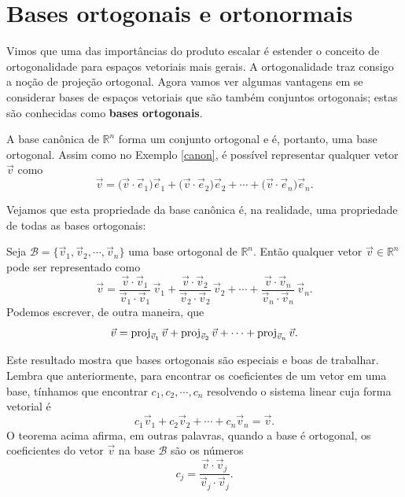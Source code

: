 \construirExer

\section{Bases ortogonais e ortonormais}


Vimos que uma das importâncias do produto escalar é estender o conceito de ortogonalidade para espaços vetoriais mais gerais. A ortogonalidade traz consigo a noção de projeção ortogonal. Agora vamos ver algumas vantagens em se considerar bases de espaços vetoriais que são também conjuntos ortogonais; estas são conhecidas como \textbf{bases ortogonais}.

\begin{ex}\label{ortonormal}
	A base canônica de $\mathbb{R}^n$ forma um conjunto ortogonal e é, portanto, uma base ortogonal. Assim como no Exemplo \ref{canon}, é possível representar qualquer vetor $\vec{v}$ como
	\begin{equation}
	\vec{v} = \big( \vec{v} \cdot \vec{e}_1 \big) \vec{e}_1 + \big( \vec{v} \cdot \vec{e}_2 \big) \vec{e}_2  + \cdots  + \big( \vec{v} \cdot \vec{e}_n \big) \vec{e}_n.
	\end{equation}
\end{ex}

Vejamos que esta propriedade da base canônica é, na realidade, uma propriedade de todas as bases ortogonais:

\begin{teo}\label{thm:base-ortogonal}
	Seja $\mathcal{B} = \{ \vec{v}_1, \vec{v}_2, \cdots, \vec{v}_n\}$ uma base ortogonal de $\mathbb{R}^n$. Então qualquer vetor $\vec{v} \in \mathbb{R}^n$ pode ser representado como
	\begin{equation}
	\vec{v} = \frac{\vec{v} \cdot \vec{v}_1}{\vec{v}_1 \cdot \vec{v}_1} \, \vec{v}_1 + \frac{\vec{v} \cdot \vec{v}_2}{\vec{v}_2 \cdot \vec{v}_2} \, \vec{v}_2  + \cdots  + \frac{\vec{v} \cdot \vec{v}_n}{\vec{v}_n \cdot \vec{v}_n} \, \vec{v}_n.
	\end{equation} Podemos escrever, de outra maneira, que
	\begin{equation}
	\vec{v} = \operatorname{proj}_{\vec{v}_1} \vec{v} +  \operatorname{proj}_{\vec{v}_2} \vec{v}  + \cdots  + \operatorname{proj}_{\vec{v}_n} \vec{v}.
	\end{equation}
\end{teo}

Este resultado mostra que bases ortogonais são especiais e boas de trabalhar. Lembra que anteriormente, para encontrar os coeficientes de um vetor em uma base, tínhamos que encontrar $c_1, c_2, \cdots, c_n$ resolvendo o sistema linear cuja forma vetorial é
\begin{equation}
c_1 \vec{v}_1 + c_2 \vec{v}_2 + \cdots + c_n \vec{v}_n = \vec{v}.
\end{equation} O teorema acima afirma, em outras palavras, quando a base é ortogonal, os coeficientes do vetor $\vec{v}$ na base $\mathcal{B}$ são os números
\begin{equation}
c_j = \frac{\vec{v} \cdot \vec{v}_j}{\vec{v}_j \cdot \vec{v}_j}.
\end{equation}

